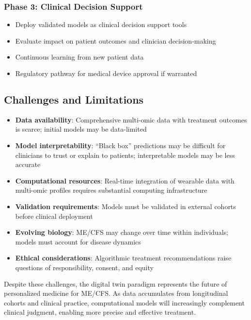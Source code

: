 \subsubsection{Phase 3: Clinical Decision Support}
\begin{itemize}
    \item Deploy validated models as clinical decision support tools
    \item Evaluate impact on patient outcomes and clinician decision-making
    \item Continuous learning from new patient data
    \item Regulatory pathway for medical device approval if warranted
\end{itemize}

\subsection{Challenges and Limitations}

\begin{itemize}
    \item \textbf{Data availability}: Comprehensive multi-omic data with treatment outcomes is scarce; initial models may be data-limited
    \item \textbf{Model interpretability}: ``Black box'' predictions may be difficult for clinicians to trust or explain to patients; interpretable models may be less accurate
    \item \textbf{Computational resources}: Real-time integration of wearable data with multi-omic profiles requires substantial computing infrastructure
    \item \textbf{Validation requirements}: Models must be validated in external cohorts before clinical deployment
    \item \textbf{Evolving biology}: ME/CFS may change over time within individuals; models must account for disease dynamics
    \item \textbf{Ethical considerations}: Algorithmic treatment recommendations raise questions of responsibility, consent, and equity
\end{itemize}

Despite these challenges, the digital twin paradigm represents the future of personalized medicine for ME/CFS. As data accumulates from longitudinal cohorts and clinical practice, computational models will increasingly complement clinical judgment, enabling more precise and effective treatment.

